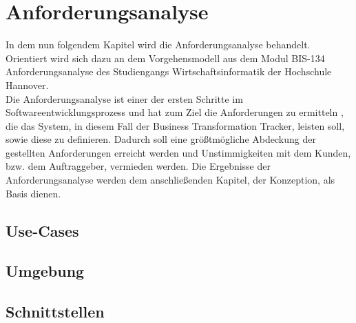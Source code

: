 \section{Anforderungsanalyse}
In dem nun folgendem Kapitel wird die Anforderungsanalyse behandelt. Orientiert wird sich dazu an dem Vorgehensmodell aus dem Modul BIS-134 Anforderungsanalyse des Studiengangs Wirtschaftsinformatik der Hochschule Hannover.\\Die Anforderungsanalyse ist einer der ersten Schritte im Softwareentwicklungsprozess und hat zum Ziel die Anforderungen zu ermitteln , die das System, in diesem Fall der Business Transformation Tracker, leisten soll, sowie diese zu definieren. Dadurch soll eine größtmögliche Abdeckung der gestellten Anforderungen erreicht werden und Unstimmigkeiten mit dem Kunden, bzw. dem Auftraggeber, vermieden werden. Die Ergebnisse der Anforderungsanalyse werden dem anschließenden Kapitel, der Konzeption, als Basis dienen.   

\subsection{Use-Cases}
\subsection{Umgebung}
\subsection{Schnittstellen}